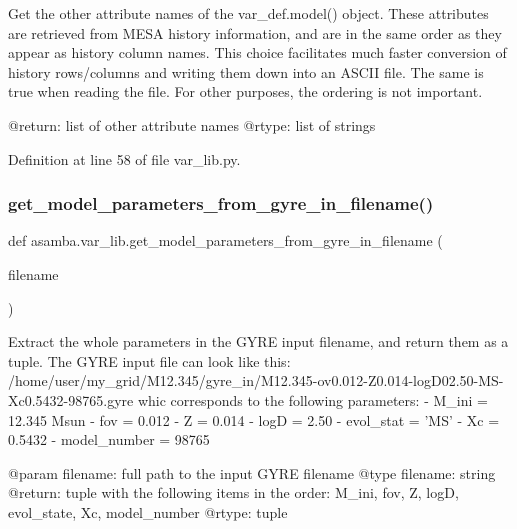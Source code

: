 \begin{DoxyVerb}Get the other attribute names of the var_def.model() object. These attributes are retrieved from
MESA history information, and are in the same order as they appear as history column names. This
choice facilitates much faster conversion of history rows/columns and writing them down into an 
ASCII file. The same is true when reading the file. For other purposes, the ordering is not 
important.

@return: list of other attribute names 
@rtype: list of strings
\end{DoxyVerb}
 

Definition at line 58 of file var\+\_\+lib.\+py.

\mbox{\label{namespaceasamba_1_1var__lib_a48d70ad01935d09c3c0bb434bc82a5e6}} 
\subsubsection{\texorpdfstring{get\+\_\+model\+\_\+parameters\+\_\+from\+\_\+gyre\+\_\+in\+\_\+filename()}{get\_model\_parameters\_from\_gyre\_in\_filename()}}
{\footnotesize\ttfamily def asamba.\+var\+\_\+lib.\+get\+\_\+model\+\_\+parameters\+\_\+from\+\_\+gyre\+\_\+in\+\_\+filename (\begin{DoxyParamCaption}\item[{}]{filename }\end{DoxyParamCaption})}

\begin{DoxyVerb}Extract the whole parameters in the GYRE input filename, and return them as a tuple. The GYRE input
file can look like this:
/home/user/my_grid/M12.345/gyre_in/M12.345-ov0.012-Z0.014-logD02.50-MS-Xc0.5432-98765.gyre
whic corresponds to the following parameters:
- M_ini    = 12.345 Msun
- fov      = 0.012
- Z        = 0.014
- logD     = 2.50
- evol_stat = 'MS'
- Xc       = 0.5432
- model_number = 98765

@param filename: full path to the input GYRE filename
@type filename: string
@return: tuple with the following items in the order: M_ini, fov, Z, logD, evol_state, Xc, model_number
@rtype: tuple
\end{DoxyVerb}
 

